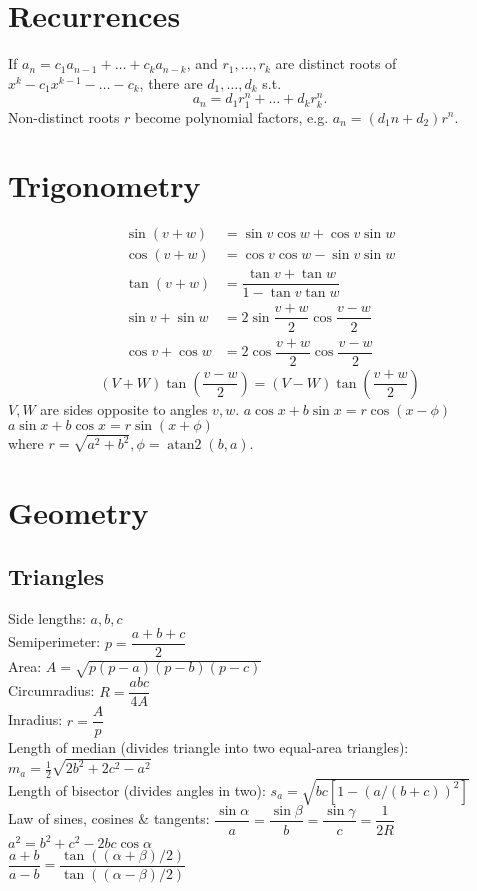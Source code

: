 \section{Recurrences}
If $a_n = c_1 a_{n-1} + \dots + c_k a_{n-k}$, and $r_1, \dots, r_k$ are distinct roots of $x^k - c_1 x^{k-1} - \dots - c_k$, there are $d_1, \dots, d_k$ s.t.
\[a_n = d_1r_1^n + \dots + d_kr_k^n. \]
Non-distinct roots $r$ become polynomial factors, e.g. $a_n = (d_1n + d_2)r^n$.

\section{Trigonometry}
\vspace{-3mm}
\begin{align*}
\sin(v+w)&{}=\sin v\cos w+\cos v\sin w\\
\cos(v+w)&{}=\cos v\cos w-\sin v\sin w\\
\tan(v+w)&{}=\dfrac{\tan v+\tan w}{1-\tan v\tan w}\\
\sin v+\sin w&{}=2\sin\dfrac{v+w}{2}\cos\dfrac{v-w}{2}\\
\cos v+\cos w&{}=2\cos\dfrac{v+w}{2}\cos\dfrac{v-w}{2}
\end{align*}
\[ (V+W)\tan(\frac{v-w}{2}){}=(V-W)\tan(\frac{v+w}{2}) \]
$V, W$ are sides opposite to angles $v, w$.
	$a\cos x+b\sin x=r\cos(x-\phi)$\\
	$a\sin x+b\cos x=r\sin(x+\phi)$\\
where $r=\sqrt{a^2+b^2}, \phi=\operatorname{atan2}(b,a)$.

\section{Geometry}

\subsection{Triangles}
Side lengths: $a,b,c$\\
Semiperimeter: $p=\dfrac{a+b+c}{2}$\\
Area: $A=\sqrt{p(p-a)(p-b)(p-c)}$\\
Circumradius: $R=\dfrac{abc}{4A}$\\
Inradius: $r=\dfrac{A}{p}$\\
Length of median (divides triangle into two equal-area triangles): $m_a=\tfrac{1}{2}\sqrt{2b^2+2c^2-a^2}$\\
Length of bisector (divides angles in two): $s_a=\sqrt{bc\left[ 1 - (a / (b+c))^2 \right]}$\\
Law of sines, cosines \& tangents: $\dfrac{\sin\alpha}{a}=\dfrac{\sin\beta}{b}=\dfrac{\sin\gamma}{c}=\dfrac{1}{2R}$\\
$a^2=b^2+c^2-2bc\cos\alpha$\\
$\dfrac{a+b}{a-b}=\dfrac{\tan((\alpha + \beta)/2)}{\tan((\alpha - \beta)/2)}$
\vspace{4mm} %
